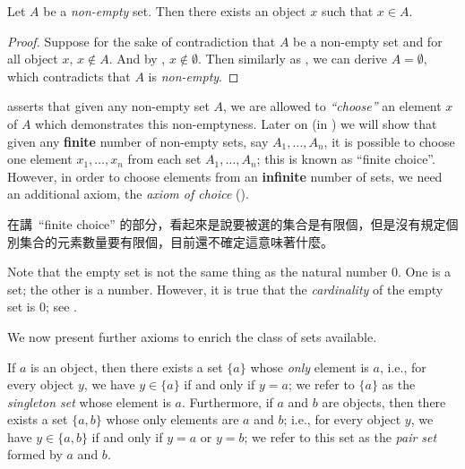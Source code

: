 \begin{lemma}\label{lem 3.1.6}
Let \(A\) be a \emph{non-empty} set. Then there exists an object \(x\) such that \(x \in A\).
\end{lemma}
\begin{proof}
Suppose for the sake of contradiction that \(A\) be a non-empty set and for all object \(x\), \(x \notin A\). And by , \(x \notin \emptyset\). Then similarly as , we can derive \(A = \emptyset\), which contradicts that \(A\) is \emph{non-empty}.
\end{proof}

\begin{remark}\label{remark 3.1.7}
 asserts that given any non-empty set \(A\), we are allowed to \emph{``choose''} an element \(x\) of \(A\) which demonstrates this non-emptyness. Later on (in ) we will show that given any \textbf{finite} number of non-empty sets, say \(A_1, \dots, A_n\), it is possible to choose one element \(x_1, \dots, x_n\) from each set \(A_1, \dots, A_n\); this is known as ``finite choice''. However, in order to choose elements from an \textbf{infinite} number of sets, we need an additional axiom, the \emph{axiom of choice} ().
\end{remark}

\begin{note}
 在講\ ``finite choice'' 的部分，看起來是說要被選的集合是有限個，但是沒有規定個別集合的元素數量要有限個，目前還不確定這意味著什麼。
\end{note}

\begin{remark} \label{remark 3.1.8}
Note that the empty set is not the same thing as the natural number \(0\). One is a set; the other is a number. However, it is true that the \emph{cardinality} of the empty set is \(0\); see .
\end{remark}

We now present further axioms to enrich the class of sets available.

\begin{axiom}\label{axm 3.3}
If \(a\) is an object, then there exists a set \( \{a\} \) whose \emph{only} element is \(a\), i.e., for every object \(y\), we have \(y \in \{a\}\) if and only if \(y = a\); we refer to \( \{a\} \) as the \emph{singleton set} whose element is \(a\). Furthermore, if \(a\) and \(b\) are objects, then there exists a set \( \{a, b\} \) whose only elements are \(a\) and \(b\); i.e., for every object \(y\), we have \( y \in \{a, b\} \) if and only if \(y = a\) or \(y = b\); we refer to this set as the \emph{pair set} formed by \(a\) and \(b\).
\end{axiom}

